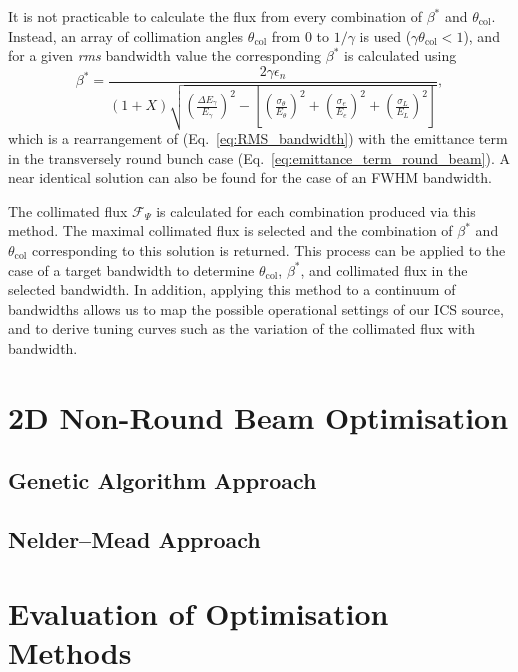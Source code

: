 \documentclass[../main.tex]{subfiles}
\begin{document}
It is not practicable to calculate the flux from every combination of $\beta^{*}$ and $\theta_{\mathrm{col}}$. Instead, an array of collimation angles $\theta_{\mathrm{col}}$ from 0 to $1/\gamma$ is used ($\gamma\theta_{\mathrm{col}}<1$), and for a given \textit{rms} bandwidth value the corresponding $\beta^*$ is calculated using
\begin{equation}
\beta^{*} = \frac{2\gamma\epsilon_{n}}{\left(1+X\right)\sqrt{\left(\frac{\Delta E_{\gamma}}{E_{\gamma}}\right)^{2}-\left[\left(\frac{\sigma_{\theta}}{E_{\theta}}\right)^{2}+\left(\frac{\sigma_{e}}{E_{e}}\right)^{2}+\left(\frac{\sigma_{L}}{E_{L}}\right)^{2}\right]}},
\label{eq:beta_star_round_beam}
\end{equation}
which is a rearrangement of (Eq.~\ref{eq:RMS_bandwidth}) with the emittance term in the transversely round bunch case (Eq.~\ref{eq:emittance_term_round_beam}). A near identical solution can also be found for the case of an FWHM bandwidth. 

The collimated flux $\mathcal{F}_{\Psi}$ is calculated for each combination produced via this method. The maximal collimated flux is selected and the combination of $\beta^{*}$ and $\theta_{\mathrm{col}}$ corresponding to this solution is returned. This process can be applied to the case of a target bandwidth to determine $\theta_{\mathrm{col}}$, $\beta^{*}$, and collimated flux in the selected bandwidth. In addition, applying this method to a continuum of bandwidths allows us to map the possible operational settings of our ICS source, and to derive tuning curves such as the variation of the collimated flux with bandwidth.

\section{2D Non-Round Beam Optimisation}

\subsection{Genetic Algorithm Approach}

\subsection{Nelder--Mead Approach}

\section{Evaluation of Optimisation Methods} 

 
\end{document}
